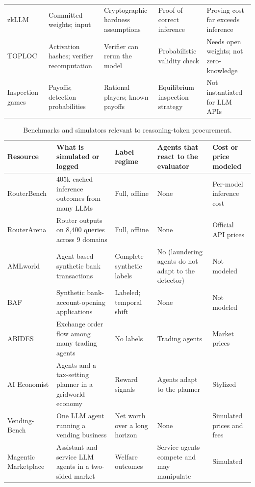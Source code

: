 \documentclass[sigconf]{acmart}
\begin{document}
\begin{table}[t]
\begin{tabular}{p{}p{}p{}p{}p{}}
    zkLLM~\cite{sun2024zkllm} & Committed weights; input & Cryptographic hardness assumptions & Proof of correct inference & Proving cost far exceeds inference \\
    TOPLOC~\cite{ong2025toploc} & Activation hashes; verifier recomputation & Verifier can rerun the model & Probabilistic validity check & Needs open weights; not zero-knowledge \\
    Inspection games~\cite{avenhaus2002inspection} & Payoffs; detection probabilities & Rational players; known payoffs & Equilibrium inspection strategy & Not instantiated for LLM APIs \\
    \bottomrule
  \end{tabular}
\end{table}


\begin{table}[t]
  \caption{Benchmarks and simulators relevant to reasoning-token procurement.}
  \label{tab:benchmarks}
  \centering
  \footnotesize
  \begin{tabular}{p{}p{}p{}p{}p{}}
    \toprule
    Resource & What is simulated or logged & Label regime & Agents that react to the evaluator & Cost or price modeled \\
    \midrule
    RouterBench \cite{hu2024routerbench} & 405k cached inference outcomes from many LLMs & Full, offline & None & Per-model inference cost \\
    RouterArena \cite{lu2025routerarena} & Router outputs on 8,400 queries across 9 domains & Full, offline & None & Official API prices \\
    AMLworld \cite{altman2023amlworld} & Agent-based synthetic bank transactions & Complete synthetic labels & No (laundering agents do not adapt to the detector) & Not modeled \\
    BAF \cite{jesus2022baf} & Synthetic bank-account-opening applications & Labeled; temporal shift & None & Not modeled \\
    ABIDES \cite{byrd2020abides} & Exchange order flow among many trading agents & No labels & Trading agents & Market prices \\
    AI Economist \cite{zheng2022aieconomist} & Agents and a tax-setting planner in a gridworld economy & Reward signals & Agents adapt to the planner & Stylized \\
    Vending-Bench \cite{backlund2025vending} & One LLM agent running a vending business & Net worth over a long horizon & None & Simulated prices and fees \\
    Magentic Marketplace \cite{bansal2025magentic} & Assistant and service LLM agents in a two-sided market & Welfare outcomes & Service agents compete and may manipulate & Simulated \\
    \bottomrule
  \end{tabular}
\end{table}
\end{document}
